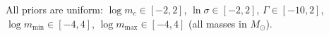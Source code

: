 All priors are uniform:
$\log m_c \in [-2, 2]$,
$\ln\sigma \in [-2, 2]$,
$\Gamma \in [-10, 2]$,
$\log m_{\min} \in [-4, 4]$,
$\log m_{\max} \in [-4, 4]$ (all masses in $M_\odot$).
